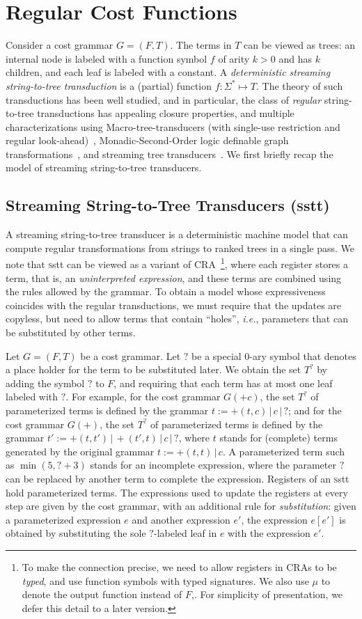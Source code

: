 \documentclass[11pt]{article}
\newcommand{\mypar}[1]{\subsection{#1}}
\def\hole{?}
\newcommand{\vocab}{F}
\newcommand{\trees}{T}
\newcommand{\ptrees}{T^{\hole}}
\newcommand{\CG}{G}
\newcommand{\sep}{\ensuremath{\,|\,}}
\newcommand{\SSTT}{{\sc\textsc sstt}\xspace}
\newcommand{\fm}[1]{\ensuremath{#1^{*}}}
\newcommand{\EDWA}{{CRA}\xspace}
\newcommand{\ie}{{\em i.e.}\xspace}
\begin{document}
\section{Regular Cost Functions} \label{sec:rcf}
Consider a cost grammar $\CG=(\vocab,\trees)$.  The terms in $\trees$
can be viewed as trees: an internal node is labeled with a function
symbol $f$ of arity $k>0$ and has $k$ children, and each leaf is
labeled with a constant.  A {\em deterministic streaming
string-to-tree transduction\/} is a (partial) function $f:\fm{\Sigma}
\mapsto \trees$.  The theory of such transductions has been well
studied, and in particular, the class of {\em regular\/}
string-to-tree transductions has appealing closure properties, and
multiple characterizations using Macro-tree-transducers (with
single-use restriction and regular
look-ahead)~\cite{engelfriet_macro2_1999}, Monadic-Second-Order logic
definable graph transformations~\cite{courcelle_graph_2002}, and
streaming tree transducers~\cite{alur_stt_2011}.  We first briefly
recap the model of streaming string-to-tree transducers.

\mypar{Streaming String-to-Tree Transducers (\SSTT)} A streaming
string-to-tree transducer is a deterministic machine model that can
compute regular transformations from strings to ranked trees in a
single pass.  We note that \SSTT can be viewed as a variant of
\EDWA~\footnote{To make the connection precise, we need to allow
registers in CRAs to be {\em typed\/}, and use function symbols with
typed signatures. We also use $\mu$ to denote the output function
instead of $F$,. For simplicity of presentation, we defer this detail
to a later version.}, where each register stores a term, that is, an
{\em uninterpreted expression}, and these terms are combined using the
rules allowed by the grammar.  To obtain a model whose expressiveness
coincides with the regular transductions, we must require that the
updates are copyless, but need to allow terms that contain ``holes'',
\ie, parameters that can be substituted by other terms.

Let $\CG=(\vocab,\trees)$ be a cost grammar.  Let $\hole$ be a special
0-ary symbol that denotes a place holder for the term to be
substituted later. We obtain the set $\ptrees$ by adding the symbol
$\hole$ to $\vocab$, and requiring that each term has at most one leaf
labeled with $\hole$.  For example, for the cost grammar $\CG(+c)$,
the set $\ptrees$ of parameterized terms is defined by the grammar $t
:= +(t,c)\sep c\sep \hole$; and for the cost grammar $\CG(+)$, the set
$\ptrees$ of parameterized terms is defined by the grammar $t' :=
+(t,t')\sep +(t',t) \sep c\sep \hole$, where $t$ stands for (complete)
terms generated by the original grammar $t := +(t,t)\sep c$.  A
parameterized term such as $\min(5,\hole+3)$ stands for an incomplete
expression, where the parameter $\hole$ can be replaced by another
term to complete the expression.  Registers of an \SSTT hold
parameterized terms.  The expressions used to update the registers at
every step are given by the cost grammar, with an additional rule for
{\em substitution\/}: given a parameterized expression $e$ and another
expression $e'$, the expression $e[e']$ is obtained by substituting
the sole $\hole$-labeled leaf in $e$ with the expression $e'$.
\end{document}
